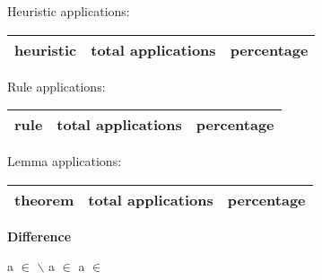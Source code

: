 \documentclass[a4paper]{article}
\begin{document}
\medskip


Heuristic applications:

\begin{supertabular}{l|r|r}
heuristic	& total applications & percentage \\ \hline

\end{supertabular}

Rule applications:

\begin{supertabular}{l|r|r}
rule	        & total applications & percentage \\ \hline

\end{supertabular}

Lemma applications:

\begin{supertabular}{l|r|r}
theorem	        & total applications & percentage \\ \hline

\end{supertabular}
\pagebreak

{\LARGE\bf Difference}\label{lemma-Difference}

\medskip

 \Fol a $\in$  $\backslash$  \Equiv a $\in$  \And \Not a $\in$ 
\end{document}
